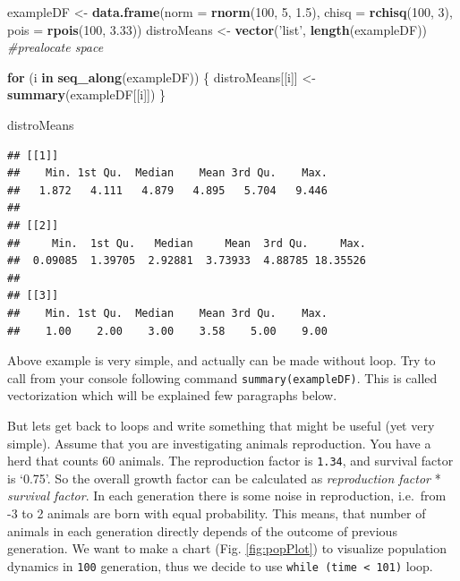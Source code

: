 \documentclass[]{book}
\newenvironment{Shaded}{\begin{snugshade}}{\end{snugshade}}
\newcommand{\KeywordTok}[1]{\textcolor[rgb]{0.13,0.29,0.53}{\textbf{#1}}}
\newcommand{\DataTypeTok}[1]{\textcolor[rgb]{0.13,0.29,0.53}{#1}}
\newcommand{\DecValTok}[1]{\textcolor[rgb]{0.00,0.00,0.81}{#1}}
\newcommand{\FloatTok}[1]{\textcolor[rgb]{0.00,0.00,0.81}{#1}}
\newcommand{\StringTok}[1]{\textcolor[rgb]{0.31,0.60,0.02}{#1}}
\newcommand{\CommentTok}[1]{\textcolor[rgb]{0.56,0.35,0.01}{\textit{#1}}}
\newcommand{\ControlFlowTok}[1]{\textcolor[rgb]{0.13,0.29,0.53}{\textbf{#1}}}
\newcommand{\NormalTok}[1]{#1}
\theoremstyle{definition}
\theoremstyle{definition}
\theoremstyle{definition}
\theoremstyle{remark}
\begin{document}
\begin{Shaded}
\begin{Highlighting}[]
\NormalTok{exampleDF <-}\StringTok{ }\KeywordTok{data.frame}\NormalTok{(}\DataTypeTok{norm =} \KeywordTok{rnorm}\NormalTok{(}\DecValTok{100}\NormalTok{, }\DecValTok{5}\NormalTok{, }\FloatTok{1.5}\NormalTok{),}
                        \DataTypeTok{chisq =} \KeywordTok{rchisq}\NormalTok{(}\DecValTok{100}\NormalTok{, }\DecValTok{3}\NormalTok{),}
                        \DataTypeTok{pois =} \KeywordTok{rpois}\NormalTok{(}\DecValTok{100}\NormalTok{, }\FloatTok{3.33}\NormalTok{))}
\NormalTok{distroMeans <-}\StringTok{ }\KeywordTok{vector}\NormalTok{(}\StringTok{'list'}\NormalTok{, }\KeywordTok{length}\NormalTok{(exampleDF)) }\CommentTok{#prealocate space}

\ControlFlowTok{for}\NormalTok{ (i }\ControlFlowTok{in} \KeywordTok{seq_along}\NormalTok{(exampleDF)) \{}
\NormalTok{  distroMeans[[i]] <-}\StringTok{ }\KeywordTok{summary}\NormalTok{(exampleDF[[i]])}
\NormalTok{\}}

\NormalTok{distroMeans}
\end{Highlighting}
\end{Shaded}

\begin{verbatim}
## [[1]]
##    Min. 1st Qu.  Median    Mean 3rd Qu.    Max. 
##   1.872   4.111   4.879   4.895   5.704   9.446 
## 
## [[2]]
##     Min.  1st Qu.   Median     Mean  3rd Qu.     Max. 
##  0.09085  1.39705  2.92881  3.73933  4.88785 18.35526 
## 
## [[3]]
##    Min. 1st Qu.  Median    Mean 3rd Qu.    Max. 
##    1.00    2.00    3.00    3.58    5.00    9.00
\end{verbatim}

Above example is very simple, and actually can be made without loop. Try
to call from your console following command \texttt{summary(exampleDF)}.
This is called vectorization which will be explained few paragraphs
below.

But lets get back to loops and write something that might be useful (yet
very simple). Assume that you are investigating animals reproduction.
You have a herd that counts 60 animals. The reproduction factor is
\texttt{1.34}, and survival factor is `0.75'. So the overall growth
factor can be calculated as \emph{reproduction factor} * \emph{survival
factor}. In each generation there is some noise in reproduction,
i.e.~from -3 to 2 animals are born with equal probability. This means,
that number of animals in each generation directly depends of the
outcome of previous generation. We want to make a chart (Fig.
\ref{fig:popPlot}) to visualize population dynamics in \texttt{100}
generation, thus we decide to use
\texttt{while\ (time\ \textless{}\ 101)} loop.
\end{document}
